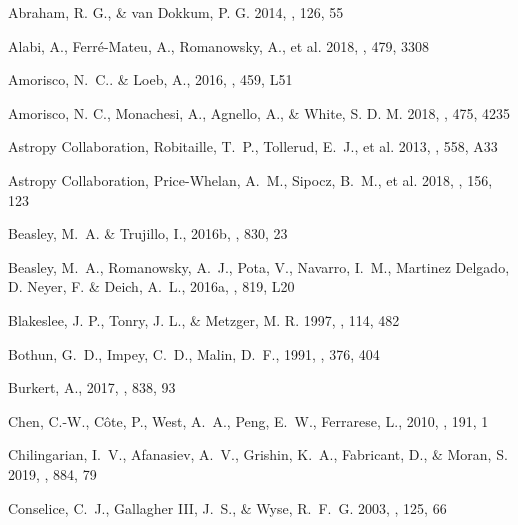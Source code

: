 \documentclass[twocolumn,tighten]{aastex63}
\begin{document}
\begin{thebibliography}{}

Abraham, R. G., \& van Dokkum, P. G. 2014, \pasp, 126, 55

Alabi, A., Ferr\'e-Mateu, A., Romanowsky, A., et al. 2018, \mnras, 479, 3308

Amorisco, N.~C.. \& Loeb, A., 2016, \mnras, 459, L51

Amorisco, N. C., Monachesi, A., Agnello, A., \& White, S. D. M. 2018, \mnras, 475, 4235

Astropy Collaboration, Robitaille, T.~P., Tollerud, E.~J., et al. 2013, \aap, 558, A33

Astropy Collaboration, Price-Whelan, A.~M., Sipocz, B.~M., et al. 2018, \aj, 156, 123

Beasley, M.~A. \& Trujillo, I., 2016b, \apj, 830, 23
        
{Beasley}, M.~A., {Romanowsky}, A.~J., {Pota}, V., {Navarro}, I.~M., {Martinez Delgado}, D. {Neyer}, F. \&	{Deich}, A.~L., 2016a, \apjl, 819, L20


Blakeslee, J. P., Tonry, J. L., \& Metzger, M. R. 1997, \aj, 114, 482

Bothun, G.~D., Impey, C.~D., Malin, D.~F., 1991, \apj , 376, 404

Burkert, A., 2017, \apj, 838, 93

Chen, C.-W., C\^{o}te, P., West, A.~A., Peng, E.~W., Ferrarese, L., 2010, \apjs, 191, 1

Chilingarian, I.~V., Afanasiev, A.~V., Grishin, K.~A., Fabricant, D., \& Moran, S. 2019, \apj, 884, 79


Conselice, C.~J., Gallagher III, J.~S., \& Wyse, R.~F.~G. 2003, \aj, 125, 66


\end{thebibliography}
\end{document}
